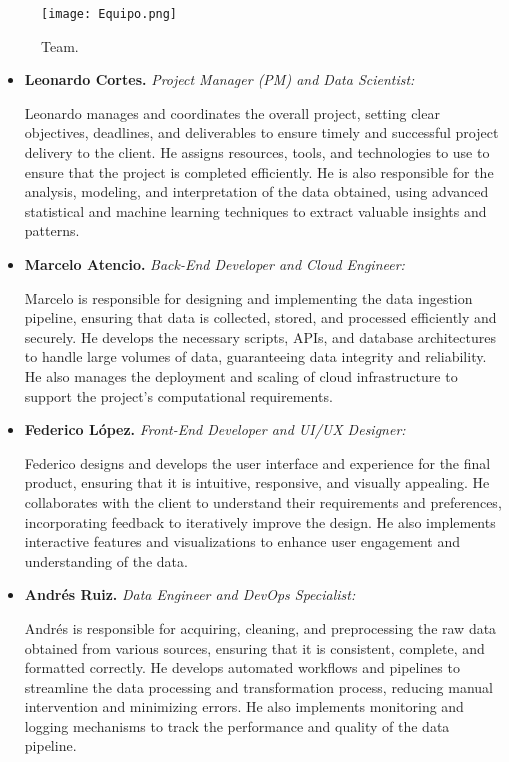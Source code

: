 \documentclass[12pt]{article}
\begin{document}
\begin{figure}[H]
  \centering
  \texttt{[image: Equipo.png]}
  \caption{Team.}
  \label{fig:Equipo ARCOL Solutions}
\end{figure}

\begin{itemize}
    \item \textbf{Leonardo Cortes.} \textit{Project Manager (PM) and Data Scientist:}
    
    Leonardo manages and coordinates the overall project, setting clear objectives, deadlines, and deliverables to ensure timely and successful project delivery to the client. He assigns resources, tools, and technologies to use to ensure that the project is completed efficiently. He is also responsible for the analysis, modeling, and interpretation of the data obtained, using advanced statistical and machine learning techniques to extract valuable insights and patterns.
    
    \item \textbf{Marcelo Atencio.} \textit{Back-End Developer and Cloud Engineer:}
    
    Marcelo is responsible for designing and implementing the data ingestion pipeline, ensuring that data is collected, stored, and processed efficiently and securely. He develops the necessary scripts, APIs, and database architectures to handle large volumes of data, guaranteeing data integrity and reliability. He also manages the deployment and scaling of cloud infrastructure to support the project's computational requirements.
    
    \item \textbf{Federico López.} \textit{Front-End Developer and UI/UX Designer:}
    
    Federico designs and develops the user interface and experience for the final product, ensuring that it is intuitive, responsive, and visually appealing. He collaborates with the client to understand their requirements and preferences, incorporating feedback to iteratively improve the design. He also implements interactive features and visualizations to enhance user engagement and understanding of the data.
    
    \item \textbf{Andrés Ruiz.} \textit{Data Engineer and DevOps Specialist:}
    
    Andrés is responsible for acquiring, cleaning, and preprocessing the raw data obtained from various sources, ensuring that it is consistent, complete, and formatted correctly. He develops automated workflows and pipelines to streamline the data processing and transformation process, reducing manual intervention and minimizing errors. He also implements monitoring and logging mechanisms to track the performance and quality of the data pipeline.
\end{itemize}
\end{document}
